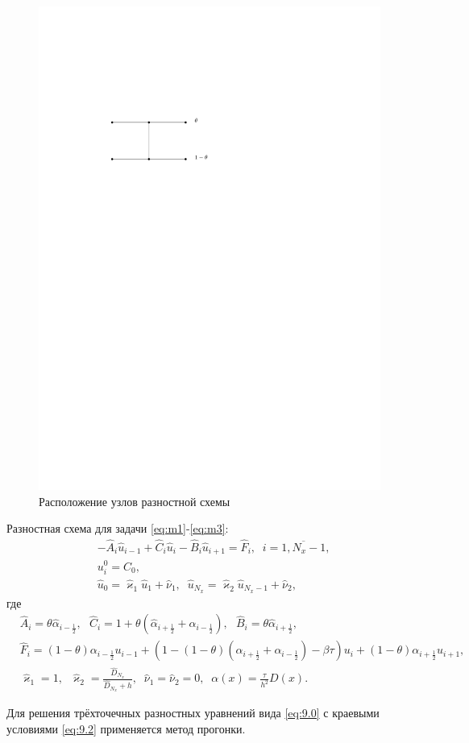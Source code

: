 \documentclass[
11pt,
master, %
subf, %
href, %
colorlinks=true, %
]{disser}
\newcommand*{\SR}[1]{\left( #1 \right)}
\newcommand*{\Ap}[2]{\hat{#1}_{#2}}
\newcommand*{\Apr}[2]{#1_{#2}}
\begin{document}
\begin{figure}[h]
	\centering
	\includegraphics[width=0.45\linewidth]{pic1}
	\caption{Расположение узлов разностной схемы}\label{ris:1}
\end{figure}

Разностная схема для задачи  \eqref{eq:m1}-\eqref{eq:m3}:
\begin{align}
	&-\Ap{A}{i} \Ap{u}{i-1} + \Ap{C}{i} \Ap{u}{i} - \Ap{B}{i} \Ap{u}{i+1} = \Ap{F}{i}, \;\; i = \overline{1,N_{x}-1}, \label{eq:9.0}\\
	& u^0_i = C_0, \label{eq:9.1}\\
	& \Ap{u}{0} = \Ap{\varkappa}{1} \Ap{u}{1} + \Ap{\nu}{1},\;\; \Ap{u}{N_{x}} = \Ap{\varkappa}{2} \Ap{u}{N_{x} -1} + \Ap{\nu}{2}, \label{eq:9.2}
\end{align}
где
{\small
\begin{align}
		&\Ap{A}{i} = \theta \Ap{\alpha}{i - \frac{1}{2}}, ~~~ \Ap{C}{i} = 1 + \theta \left(\Ap{\alpha}{i + \frac{1}{2}} + \Ap{\alpha}{i - \frac{1}{2}}\right), ~~~ \Ap{B}{i} = \theta \Ap{\alpha}{i + \frac{1}{2}} , \label{eq:10.1}\\
		& \Ap{F}{i} = (1 - \theta) \Apr{\alpha}{i - \frac{1}{2}} \Apr{u}{i-1} + \SR{1 - (1 - \theta) \left(\Apr{\alpha}{i + \frac{1}{2}} + \Apr{\alpha}{i - \frac{1}{2}}\right) - \beta \tau} \Apr{u}{i} + (1 - \theta) \Apr{\alpha}{i + \frac{1}{2}} \Apr{u}{i+1}, \label{eq:10.4}\\
		&\Ap{\varkappa}{1} = 1, \;\; \Ap{\varkappa}{2} = \frac{\Ap{D}{N_x}}{\Ap{D}{N_x} + h}, \;\; \Ap{\nu}{1} = \Ap{\nu}{2} = 0, \;\;  \alpha(x) = \frac{\tau}{h^2} D(x). \label{eq:10.5}
\end{align}
}

Для решения трёхточечных разностных уравнений вида \eqref{eq:9.0} с краевыми условиями \eqref{eq:9.2} применяется метод прогонки.
\end{document}
